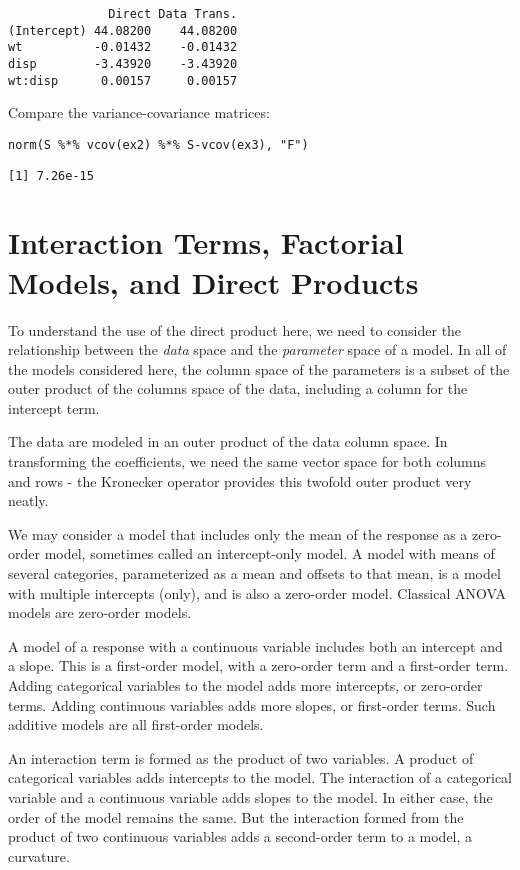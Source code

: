 \documentclass[]{article}
\begin{document}
\begin{verbatim}
              Direct Data Trans.
(Intercept) 44.08200    44.08200
wt          -0.01432    -0.01432
disp        -3.43920    -3.43920
wt:disp      0.00157     0.00157
\end{verbatim}

Compare the variance-covariance matrices:

\begin{verbatim}
norm(S %*% vcov(ex2) %*% S-vcov(ex3), "F")
\end{verbatim}

\begin{verbatim}
[1] 7.26e-15
\end{verbatim}

\section{Interaction Terms, Factorial Models, and Direct
Products}\label{interaction-terms-factorial-models-and-direct-products}

To understand the use of the direct product here, we need to consider
the relationship between the \emph{data} space and the \emph{parameter}
space of a model. In all of the models considered here, the column space
of the parameters is a subset of the outer product of the columns space
of the data, including a column for the intercept term.

The data are modeled in an outer product of the data column space. In
transforming the coefficients, we need the same vector space for both
columns and rows - the Kronecker operator provides this twofold outer
product very neatly.

We may consider a model that includes only the mean of the response as a
zero-order model, sometimes called an intercept-only model. A model with
means of several categories, parameterized as a mean and offsets to that
mean, is a model with multiple intercepts (only), and is also a
zero-order model. Classical ANOVA models are zero-order models.

A model of a response with a continuous variable includes both an
intercept and a slope. This is a first-order model, with a zero-order
term and a first-order term. Adding categorical variables to the model
adds more intercepts, or zero-order terms. Adding continuous variables
adds more slopes, or first-order terms. Such additive models are all
first-order models.

An interaction term is formed as the product of two variables. A product
of categorical variables adds intercepts to the model. The interaction
of a categorical variable and a continuous variable adds slopes to the
model. In either case, the order of the model remains the same. But the
interaction formed from the product of two continuous variables adds a
second-order term to a model, a curvature.
\end{document}
